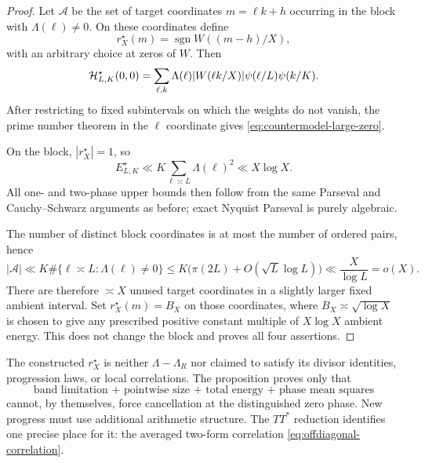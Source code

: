 \begin{proof}
Let $\mathcal A$ be the set of target coordinates
$m=\ell k+h$ occurring in the block with $\Lambda(\ell)\ne0$.  On
these coordinates define
\begin{equation}
 r^\star_X(m)=\operatorname{sgn}W((m-h)/X),
 \label{eq:countermodel-on-block}
\end{equation}
with an arbitrary choice at zeros of $W$.  Then
\begin{equation}
 \mathcal H^\star_{L,K}(0,0)
 =\sum_{\ell,k}\Lambda(\ell)|W(\ell k/X)|
 \psi(\ell/L)\psi(k/K).
 \label{eq:countermodel-positive-sum}
\end{equation}
After restricting to fixed subintervals on which the weights do not
vanish, the prime number theorem in the $\ell$ coordinate gives
\eqref{eq:countermodel-large-zero}.

On the block, $|r^\star_X|=1$, so
\begin{equation}
 E^\star_{L,K}
 \ll K\sum_{\ell\asymp L}\Lambda(\ell)^2
 \ll X\log X.
 \label{eq:countermodel-block-energy}
\end{equation}
All one- and two-phase upper bounds then follow from the same Parseval
and Cauchy--Schwarz arguments as before; exact Nyquist Parseval is
purely algebraic.

The number of distinct block coordinates is at most the number of
ordered pairs, hence
\begin{equation}
 |\mathcal A|
 \ll K\#\{\ell\asymp L:\Lambda(\ell)\ne0\}
 \le K\bigl(\pi(2L)+O(\sqrt L\log L)\bigr)
 \ll\frac X{\log L}=o(X).
 \label{eq:countermodel-used-coordinates}
\end{equation}
There are therefore $\asymp X$ unused target coordinates in a slightly
larger fixed ambient interval.  Set $r^\star_X(m)=B_X$ on those coordinates,
where $B_X\asymp\sqrt{\log X}$ is chosen to give any prescribed
positive constant multiple of $X\log X$ ambient energy.  This does not
change the block and proves all four assertions.
\end{proof}

\begin{remark}
The constructed $r^\star_X$ is neither $\Lambda-\Lambda_R$ nor claimed
to satisfy its divisor identities, progression laws, or local
correlations.  The proposition proves only that
\begin{equation}
 \text{band limitation + pointwise size + total energy
 + phase mean squares}
 \label{eq:no-go-information-list}
\end{equation}
cannot, by themselves, force cancellation at the distinguished zero
phase.  New progress must use additional arithmetic structure.  The
$TT^*$ reduction identifies one precise place for it: the averaged
two-form correlation \eqref{eq:offdiagonal-correlation}.
\end{remark}
